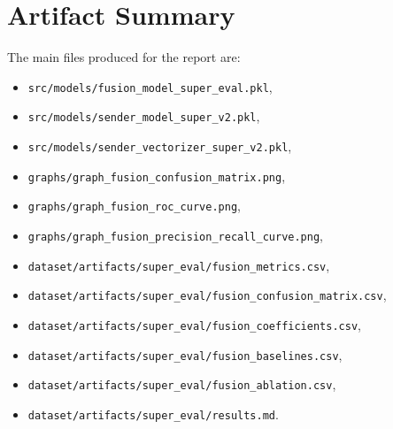 \section{Artifact Summary}
The main files produced for the report are:
\begin{itemize}
  \item \texttt{src/models/fusion\_model\_super\_eval.pkl},
  \item \texttt{src/models/sender\_model\_super\_v2.pkl},
  \item \texttt{src/models/sender\_vectorizer\_super\_v2.pkl},
  \item \texttt{graphs/graph\_fusion\_confusion\_matrix.png},
  \item \texttt{graphs/graph\_fusion\_roc\_curve.png},
  \item \texttt{graphs/graph\_fusion\_precision\_recall\_curve.png},
  \item \texttt{dataset/artifacts/super\_eval/fusion\_metrics.csv},
  \item \texttt{dataset/artifacts/super\_eval/fusion\_confusion\_matrix.csv},
  \item \texttt{dataset/artifacts/super\_eval/fusion\_coefficients.csv},
  \item \texttt{dataset/artifacts/super\_eval/fusion\_baselines.csv},
  \item \texttt{dataset/artifacts/super\_eval/fusion\_ablation.csv},
  \item \texttt{dataset/artifacts/super\_eval/results.md}.
\end{itemize}

